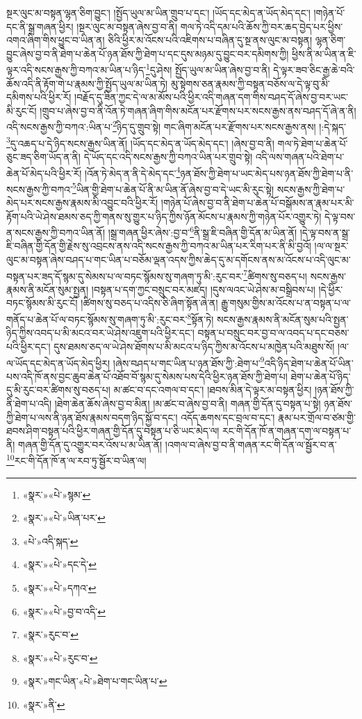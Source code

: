 སྔར་ལུང་མ་བསྟན་ལྷན་ཅིག་བྱུང་། །སྤྱོད་ཡུལ་མ་ཡིན་གྲུབ་པ་དང་། །ཡོད་དང་མེད་ན་ཡོད་མེད་དང་། །གཉེན་པོ་དང་ནི་སྒྲ་གཞན་ཕྱིར། །སྔར་ལུང་མ་བསྟན་ཞེས་བྱ་བ་ནི། གལ་ཏེ་འདི་དམ་པའི་ཆོས་ཀྱི་བར་ཆད་བྱེད་པར་ཕྱིས་འགའ་ཞིག་གིས་ཕྱུང་བ་ཡིན་ན། ཅིའི་ཕྱིར་མ་འོངས་པའི་འཇིགས་པ་བཞིན་དུ་སྔ་ནས་ལུང་མ་བསྟན། ལྷན་ཅིག་བྱུང་ཞེས་བྱ་བ་ནི་ཐེག་པ་ཆེན་པོ་ཉན་ཐོས་ཀྱི་ཐེག་པ་དང་དུས་མཉམ་དུ་བྱུང་བར་དམིགས་ཀྱི། ཕྱིས་ནི་མ་ཡིན་ན་ཇི་ལྟར་འདི་སངས་རྒྱས་ཀྱི་བཀའ་མ་ཡིན་པ་ཉིད་\footnote{«སྣར་»«པེ་»སྙམ་}དུ་ཤེས། སྤྱོད་ཡུལ་མ་ཡིན་ཞེས་བྱ་བ་ནི། དེ་ལྟར་ཟབ་ཅིང་རྒྱ་ཆེ་བའི་ཆོས་འདི་ནི་རྟོག་གེ་པ་རྣམས་ཀྱི་སྤྱོད་ཡུལ་མ་ཡིན་ཏེ། མུ་སྟེགས་ཅན་རྣམས་ཀྱི་བསྟན་བཅོས་ལ་དེ་ལྟ་བུ་མི་དམིགས་པའི་ཕྱིར་རོ། །བརྗོད་དུ་ཟིན་ཀྱང་དེ་ལ་མ་མོས་པའི་ཕྱིར་འདི་གཞན་དག་གིས་བཤད་དོ་ཞེས་བྱ་བར་ཡང་མི་རུང་ངོ། །གྲུབ་པ་ཞེས་བྱ་བ་ནི་འོན་ཏེ་གཞན་ཞིག་གིས་མངོན་པར་རྫོགས་པར་སངས་རྒྱས་ནས་བཤད་དོ་ཞེ་ན་ནི། འདི་སངས་རྒྱས་ཀྱི་བཀའ་:ཡིན་པ་\footnote{«སྣར་»«པེ་»ཡིན་པར་}ཉིད་དུ་གྲུབ་སྟེ། གང་ཞིག་མངོན་པར་རྫོགས་པར་སངས་རྒྱས་ནས། །:དེ་སྐད་\footnote{«པེ་»འདི་སྐད་}དུ་འཆད་པ་དེ་ཉིད་སངས་རྒྱས་ཡིན་ནོ། །ཡོད་དང་མེད་ན་ཡོད་མེད་དང་། །ཞེས་བྱ་བ་ནི། གལ་ཏེ་ཐེག་པ་ཆེན་པོ་ཅུང་ཟད་ཅིག་ཡོད་ན་ནི། དེ་ཡོད་དང་འདི་སངས་རྒྱས་ཀྱི་བཀའ་ཡིན་པར་གྲུབ་སྟེ། འདི་ལས་གཞན་པའི་ཐེག་པ་ཆེན་པོ་མེད་པའི་ཕྱིར་རོ། །འོན་ཏེ་མེད་ན་ནི་དེ་མེད་དང་\footnote{«སྣར་»«པེ་»དང་དེ་}ཉན་ཐོས་ཀྱི་ཐེག་པ་ཡང་མེད་པས་ཉན་ཐོས་ཀྱི་ཐེག་པ་ནི་སངས་རྒྱས་ཀྱི་བཀའ་\footnote{«སྣར་»«པེ་»དཀའ་}ཡིན་གྱི་ཐེག་པ་ཆེན་པོ་ནི་མ་ཡིན་ནོ་ཞེས་བྱ་བ་དེ་ཡང་མི་རུང་སྟེ། སངས་རྒྱས་ཀྱི་ཐེག་པ་མེད་པར་སངས་རྒྱས་རྣམས་མི་འབྱུང་བའི་ཕྱིར་རོ། །གཉེན་པོ་ཞེས་བྱ་བ་ནི་ཐེག་པ་ཆེན་པོ་བསྒོམས་ན་རྣམ་པར་མི་རྟོག་པའི་ཡེ་ཤེས་ཐམས་ཅད་ཀྱི་གནས་སུ་གྱུར་པ་ཉིད་ཀྱིས་ཉོན་མོངས་པ་རྣམས་ཀྱི་གཉེན་པོར་འགྱུར་ཏེ། དེ་ལྟ་བས་ན་སངས་རྒྱས་ཀྱི་བཀའ་ཡིན་ནོ། །སྒྲ་གཞན་ཕྱིར་ཞེས་:བྱ་བ་\footnote{«སྣར་»«པེ་»བྱ་བ་འདི་}ནི་སྒྲ་ཇི་བཞིན་གྱི་དོན་མ་ཡིན་ནོ། །དེ་ལྟ་བས་ན་སྒྲ་ཇི་བཞིན་གྱི་དོན་གྱི་རྗེས་སུ་འབྲངས་ནས་འདི་སངས་རྒྱས་ཀྱི་བཀའ་མ་ཡིན་པར་རིག་པར་ནི་མི་བྱའོ། །ལ་ལ་སྔར་ལུང་མ་བསྟན་ཞེས་བཤད་པ་གང་ཡིན་པ་བཅོམ་ལྡན་འདས་ཀྱིས་ཆེད་དུ་མ་དགོངས་ནས་མ་འོངས་པ་འདི་ལུང་མ་བསྟན་པར་ཟད་དོ་སྙམ་དུ་སེམས་པ་ལ་བཏང་སྙོམས་སུ་གཞག་ཏུ་མི་:རུང་བར་\footnote{«སྣར་»རུང་བ་}ཚིགས་སུ་བཅད་པ། སངས་རྒྱས་རྣམས་ནི་མངོན་སུམ་སྤྱན། །བསྟན་པ་དག་ཀྱང་བསྲུང་བར་མཛད། །དུས་ལའང་ཡེ་ཤེས་མ་བསྒྲིབས་པ། །དེ་ཕྱིར་བཏང་སྙོམས་མི་རུང་ངོ། །ཚིགས་སུ་བཅད་པ་འདིས་ཅི་ཞིག་སྟོན་ཞེ་ན། རྒྱུ་གསུམ་གྱིས་མ་འོངས་པ་ན་བསྟན་པ་ལ་གནོད་པ་ཆེན་པོ་ལ་བཏང་སྙོམས་སུ་གཞག་ཏུ་མི་:རུང་བར་\footnote{«སྣར་»«པེ་»རུང་བ་}སྟོན་ཏེ། སངས་རྒྱས་རྣམས་ནི་མངོན་སུམ་པའི་སྤྱན་ཉིད་ཀྱིས་འབད་པ་མི་མངའ་བར་ཡེ་ཤེས་འཇུག་པའི་ཕྱིར་དང་། བསྟན་པ་བསྲུང་བར་བྱ་བ་ལ་འབད་པ་དང་བཅས་པའི་ཕྱིར་དང་། དུས་ཐམས་ཅད་ལ་ཡེ་ཤེས་ཐོགས་པ་མི་མངའ་པ་ཉིད་ཀྱིས་མ་འོངས་པ་མཁྱེན་པའི་མཐུས་སོ། །ལ་ལ་ཡོད་དང་མེད་ན་ཡོད་མེད་ཕྱིར། །ཞེས་བཤད་པ་གང་ཡིན་པ་ཉན་ཐོས་ཀྱི་:ཐེག་པ་\footnote{«སྣར་»གང་ཡིན་«པེ་»ཐེག་པ་གང་ཡིན་པ་}འདི་ཉིད་ཐེག་པ་ཆེན་པོ་ཡིན་པས་འདི་ཁོ་ནས་བྱང་ཆུབ་ཆེན་པོ་འཐོབ་བོ་སྙམ་དུ་སེམས་པས་དེའི་ཕྱིར་ཉན་ཐོས་ཀྱི་ཐེག་པ། ཐེག་པ་ཆེན་པོ་ཉིད་དུ་མི་རུང་བར་ཚིགས་སུ་བཅད་པ། མ་ཚང་བ་དང་འགལ་བ་དང་། །ཐབས་མིན་དེ་ལྟར་མ་བསྟན་ཕྱིར། །ཉན་ཐོས་ཀྱི་ནི་ཐེག་པ་འདི། །ཐེག་ཆེན་ཆོས་ཞེས་བྱ་བ་མིན། །མ་ཚང་བ་ཞེས་བྱ་བ་ནི། གཞན་གྱི་དོན་དུ་བསྟན་པ་སྟེ། ཉན་ཐོས་ཀྱི་ཐེག་པ་ལས་ནི་ཉན་ཐོས་རྣམས་བདག་ཉིད་སྐྱོ་བ་དང་། འདོད་ཆགས་དང་བྲལ་བ་དང་། རྣམ་པར་གྲོལ་བ་ཙམ་གྱི་ཐབས་ཤིག་བསྟན་པའི་ཕྱིར་གཞན་གྱི་དོན་དུ་བསྟན་པ་ཅི་ཡང་མེད་ལ། རང་གི་དོན་ཁོ་ན་གཞན་དག་ལ་བསྟན་པ་ནི། གཞན་གྱི་དོན་དུ་འགྱུར་བར་འོས་པ་མ་ཡིན་ནོ། །འགལ་བ་ཞེས་བྱ་བ་ནི་གཞན་རང་གི་དོན་ལ་སྦྱོར་བ་ན་\footnote{«སྣར་»ནི་}རང་གི་དོན་ཁོ་ན་ལ་རབ་ཏུ་སྦྱོར་བ་ཡིན་ལ། 